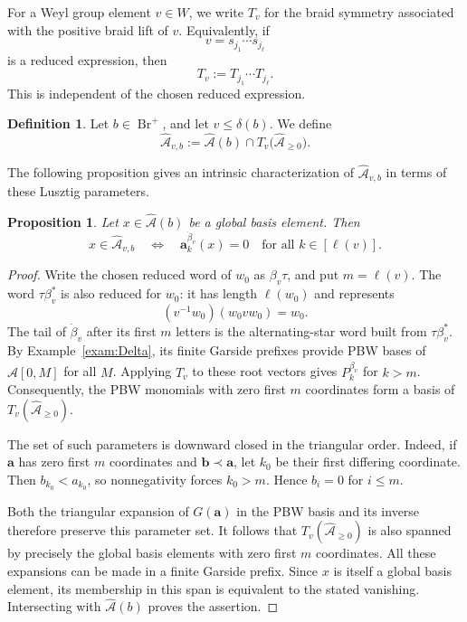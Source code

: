 \documentclass[12pt, reqno]{amsart}
\theoremstyle{plain}
\newtheorem{proposition}[theorem]{Proposition}
\theoremstyle{definition}
\newtheorem{definition}[theorem]{Definition}
\numberwithin{equation}{section}
\newcommand{\bfa}{\mathbf{a}}
\newcommand{\cA}{\mathcal{A}}
\newcommand{\Br}{{\operatorname{Br}}}
\begin{document}
For a Weyl group element \(v\in W\), we write \(T_v\) for the braid symmetry
associated with the positive braid lift of \(v\). Equivalently, if
\[
v=s_{j_1}\cdots s_{j_\ell}
\]
is a reduced expression, then
\[
T_v:=T_{j_1}\cdots T_{j_\ell}.
\]
This is independent of the chosen reduced expression.

\begin{definition}
Let \(b\in\Br^+\), and let \(v\le \delta(b)\). We define
\[
\widehat{\mathcal A}_{v,b}
:=
\widehat{\mathcal A}(b)\cap T_v\bigl(\widehat{\mathcal A}_{\ge0}\bigr).
\]
\end{definition}


The following proposition gives an intrinsic characterization of
\(\widehat{\cA}_{v,b}\) in terms of these Lusztig parameters.

\begin{proposition}\label{prop:Avb-characterization}
Let \(x\in \widehat{\cA}(b)\) be a global basis element. Then
\[
x\in \widehat{\cA}_{v,b}
\quad\Longleftrightarrow\quad
\bfa^{\dot{\beta}_v}_k(x)=0
\quad \text{for all } k\in[\ell(v)].
\]
\end{proposition}

\begin{proof}
Write the chosen reduced word of \(w_0\) as \(\beta_v\tau\), and
put \(m=\ell(v)\). The word \(\tau\beta_v^*\) is also reduced for
\(w_0\): it has length \(\ell(w_0)\) and represents
\[
 (v^{-1}w_0)(w_0vw_0)=w_0.
\]
The tail of \(\dot\beta_v\) after its first \(m\) letters is the
alternating-star word built from \(\tau\beta_v^*\). By
Example~\ref{exam:Delta}, its finite Garside prefixes provide PBW
bases of \(\widehat{\cA}[0,M]\) for all \(M\). Applying \(T_v\)
to these root vectors gives \(P_k^{\dot\beta_v}\) for \(k>m\).
Consequently, the PBW monomials with zero first \(m\) coordinates
form a basis of \(T_v(\widehat{\cA}_{\ge0})\).

The set of such parameters is downward closed in the triangular
order. Indeed, if \(\mathbf a\) has zero first \(m\) coordinates
and \(\mathbf b\prec\mathbf a\), let \(k_0\) be their first
differing coordinate. Then \(b_{k_0}<a_{k_0}\), so nonnegativity
forces \(k_0>m\). Hence \(b_i=0\) for \(i\le m\).

Both the triangular expansion of \(G(\mathbf a)\) in the PBW basis
and its inverse therefore preserve this parameter set. It follows
that \(T_v(\widehat{\cA}_{\ge0})\) is also spanned by precisely the
global basis elements with zero first \(m\) coordinates. All these
expansions can be made in a finite Garside prefix. Since \(x\) is
itself a global basis element, its membership in this span is
equivalent to the stated vanishing. Intersecting with
\(\widehat{\cA}(b)\) proves the assertion.
\end{proof}
\end{document}
